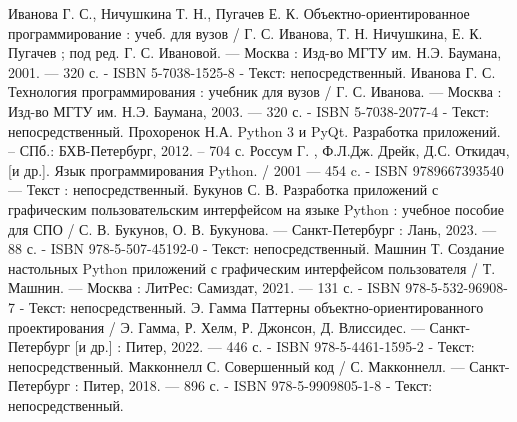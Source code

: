 \begin{thebibliography}{9}
     Иванова Г. С., Ничушкина Т. Н., Пугачев Е. К. Объектно-ориентированное программирование : учеб. для вузов / Г. С. Иванова, Т. Н. Ничушкина, Е. К. Пугачев ; под ред. Г. С. Ивановой. — Москва : Изд-во МГТУ им. Н.Э. Баумана, 2001. — 320 с. - ISBN 5-7038-1525-8 - Текст: непосредственный.
     Иванова Г. С. Технология программирования : учебник для вузов / Г. С. Иванова. — Москва : Изд-во МГТУ им. Н.Э. Баумана, 2003. — 320 с. - ISBN 5-7038-2077-4 - Текст: непосредственный.
     Прохоренок Н.А. Python 3 и PyQt. Разработка приложений. – СПб.: БХВ-Петербург, 2012. – 704 с.
     Россум Г. , Ф.Л.Дж. Дрейк, Д.С. Откидач, [и др.]. Язык программирования Python. / 2001 — 454 c. - ISBN 9789667393540  — Текст : непосредственный.
     Букунов С. В. Разработка приложений с графическим пользовательским интерфейсом на языке Python : учебное пособие для СПО / С. В. Букунов, О. В. Букунова. — Санкт-Петербург : Лань, 2023. — 88 с. - ISBN 978-5-507-45192-0 - Текст: непосредственный.
     Машнин Т. Создание настольных Python приложений с графическим интерфейсом пользователя / Т. Машнин. — Москва : ЛитРес: Самиздат, 2021. — 131 с. - ISBN 978-5-532-96908-7 - Текст: непосредственный.
     Э. Гамма Паттерны объектно-ориентированного проектирования / Э. Гамма, Р. Хелм, Р. Джонсон, Д. Влиссидес. — Санкт-Петербург [и др.] : Питер, 2022. — 446 с. - ISBN 978-5-4461-1595-2 - Текст: непосредственный.
     Макконнелл С. Совершенный код / С. Макконнелл. — Санкт-Петербург : Питер, 2018. — 896 с. - ISBN 978-5-9909805-1-8 - Текст: непосредственный.
\end{thebibliography}
